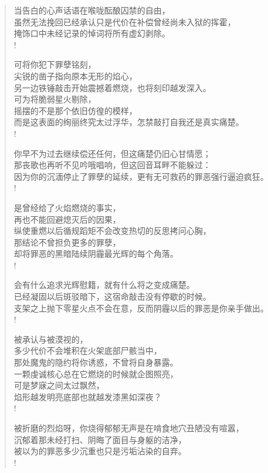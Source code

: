 \documentclass[UTF8, 12pt, a4paper]{ctexrep} %
\begin{document}
\begin{verse}
当告白的心声话语在喉咙酝酿囚禁的自由，\\
虽然无法挽回已经承认只是代价在补偿曾经尚未入狱的挥霍，\\
掩饰口中未经记录的悼词将所有虚幻剥除。\\!

可将你犯下罪孽铭刻，\\
尖锐的凿子指向原本无形的焰心，\\
另一边铁锤敲击开始震撼着燃烧，也将刻印越发深入。\\
可为将脆弱星火剔除，\\
摇摆的不是那个依旧仿徨的模样，\\
而是这表面的绚丽终究太过浮华，怎禁敲打自我还是真实痛楚。\\!

你早不为过去继续偿还任何，但这痛楚仍旧心甘情愿；\\
那丧歌也再听不见吟哦唱响，但这回音耳畔不能躲过：\\
因为你的沉湎停止了罪孽的延续，更有无可救药的罪恶强行逼迫疯狂。\\!

是曾经给了火焰燃烧的事实，\\
再也不能回避熄灭后的因果，\\
纵使重燃以后循规蹈矩不会改变热切的反思拷问心胸，\\
那结论不曾担负更多的罪孽，\\
却将罪恶的黑暗陆续阴霾最光辉的每个角落。\\!

会有什么追求光辉慰籍，就有什么将之变成痛楚。\\
已经凝固以后斑驳暗下，这宿命敲击没有停歇的时候。\\
支架之上抛下零星火点不会在意，反而阴霾以后的罪恶是你亲手做出。\\!

被承认与被漠视的，\\
多少代价不会堆积在火架底部尸骸当中，\\
那处魔鬼的隐约将你诱惑，不曾将自身暴露。\\
一颗虔诚核心总在它燃烧的时候就企图照亮，\\
可是梦寐之间太过飘然，\\
焰形越发明亮底部也就越发漆黑如深夜？\\!

被折磨的烈焰呀，你烧得郁郁无声是在啃食地穴丑陋没有喧嚣，\\
沉郁着那未经打扫、阴晦了面目与身躯的洁净，\\
被以为的罪恶多少沉重也只是污垢沾染的自弃。\\!


\end{verse}
\end{document}
